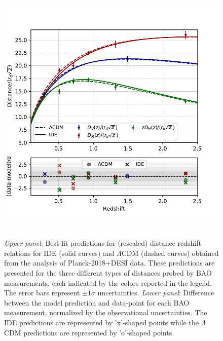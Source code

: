 \documentclass[superscriptaddress,twocolumn,showpacs,a4paper,
amssymb,amsmath,nobibnotes,aps,prl,
showkeys,
nofootinbib,notitlepage]{revtex4-1}
\begin{document}
\begin{figure}[htpb!]
    \centering
    \includegraphics[width=\columnwidth]{Figure2.pdf} \,\,\,
    \caption{\textit{Upper panel}: Best-fit predictions for (rescaled) distance-redshift relations for IDE (solid curves) and $\Lambda$CDM (dashed curves) obtained from the analysis of Planck-2018+DESI data. These predictions are presented for the three different types of distances probed by BAO measurements, each indicated by the colors reported in the legend. The error bars represent $\pm 1 \sigma$ uncertainties. \textit{Lower panel}: Difference between the model prediction and data-point for each BAO measurement, normalized by the observational uncertainties. The IDE predictions are represented by 'x'-shaped points while the $\Lambda$CDM predictions are represented by 'o'-shaped points.}
    \label{fig:BAO}
\end{figure}


\bigskip
\end{document}
